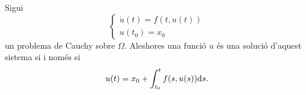 \documentclass[../Apunts.tex]{subfiles}
\begin{document}
	\begin{observation}
		\label{obs:solució general d'un problema de Cauchy}
		Sigui
		\[\begin{cases*}
			\displaystyle \dot{u}(t)=f(t,u(t)) \\
			\displaystyle u(t_{0})=x_{0}
		\end{cases*}\]
		un problema de Cauchy sobre \(\Omega\). Aleshores una funció \(u\) és una solució d'aquest sistema si i només si
		\[u(t)=x_{0}+\int_{t_{0}}^{t}f(s,u(s))\mathrm{d} s.\]
	\end{observation}
\end{document}
